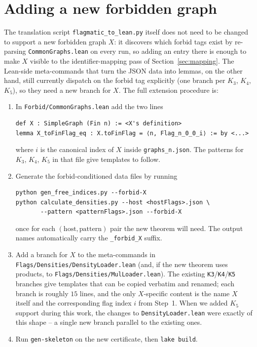 \documentclass[11pt]{article}
\begin{document}
\section{Adding a new forbidden graph}
\label{sec:extension}

The translation script \texttt{flagmatic\_to\_lean.py} itself does not
need to be changed to support a new forbidden graph $X$: it discovers
which forbid tags exist by re-parsing \texttt{CommonGraphs.lean} on
every run, so adding an entry there is enough to make $X$ visible to the
identifier-mapping pass of Section~\ref{sec:mapping}. The Lean-side
meta-commands that turn the JSON data into lemmas, on the other hand,
still currently dispatch on the forbid tag explicitly (one branch per
$K_3$, $K_4$, $K_5$), so they need a new branch for $X$. The full
extension procedure is:
\begin{enumerate}
  \item In \texttt{Forbid/CommonGraphs.lean} add the two lines
\begin{lstlisting}
def X : SimpleGraph (Fin n) := <X's definition>
lemma X_toFinFlag_eq : X.toFinFlag = ⟨n, Flag_n_0_0_i⟩ := by <...>
\end{lstlisting}
    where $i$ is the canonical index of $X$ inside
    \texttt{graphs\_n.json}. The patterns for $K_3$, $K_4$, $K_5$ in
    that file give templates to follow.
  \item Generate the forbid-conditioned data files by running
\begin{lstlisting}[language={}]
python gen_free_indices.py --forbid-X
python calculate_densities.py --host <hostFlags>.json \
       --pattern <patternFlags>.json --forbid-X
\end{lstlisting}
    once for each $(\text{host},\text{pattern})$ pair the new theorem
    will need. The output names automatically carry the
    \texttt{\_forbid\_X} suffix.
  \item Add a branch for $X$ to the meta-commands in
    \texttt{Flags/Densities/DensityLoader.lean} (and, if the new
    theorem uses products, to
    \texttt{Flags/Densities/MulLoader.lean}). The existing
    \texttt{K3}/\texttt{K4}/\texttt{K5} branches give templates that
    can be copied verbatim and renamed; each branch is roughly $15$
    lines, and the only $X$-specific content is the name $X$ itself
    and the corresponding flag index $i$ from Step~1. When we added
    $K_5$ support during this work, the changes to
    \texttt{DensityLoader.lean} were exactly of this shape -- a single
    new branch parallel to the existing ones.
  \item Run \texttt{gen-skeleton} on the new certificate, then
    \texttt{lake build}.
\end{enumerate}
\end{document}
